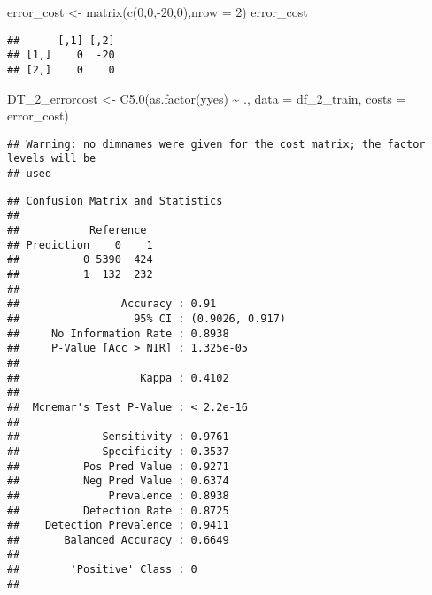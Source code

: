 \documentclass[
]{article}
\newenvironment{Shaded}{\begin{snugshade}}{\end{snugshade}}
\newcommand{\AttributeTok}[1]{\textcolor[rgb]{0.77,0.63,0.00}{#1}}
\newcommand{\DecValTok}[1]{\textcolor[rgb]{0.00,0.00,0.81}{#1}}
\newcommand{\FunctionTok}[1]{\textcolor[rgb]{0.00,0.00,0.00}{#1}}
\newcommand{\NormalTok}[1]{#1}
\newcommand{\OtherTok}[1]{\textcolor[rgb]{0.56,0.35,0.01}{#1}}
\newcommand{\SpecialCharTok}[1]{\textcolor[rgb]{0.00,0.00,0.00}{#1}}
\begin{document}
\begin{Shaded}
\begin{Highlighting}[]
\NormalTok{error\_cost }\OtherTok{\textless{}{-}} \FunctionTok{matrix}\NormalTok{(}\FunctionTok{c}\NormalTok{(}\DecValTok{0}\NormalTok{,}\DecValTok{0}\NormalTok{,}\SpecialCharTok{{-}}\DecValTok{20}\NormalTok{,}\DecValTok{0}\NormalTok{),}\AttributeTok{nrow =} \DecValTok{2}\NormalTok{)}
\NormalTok{error\_cost}
\end{Highlighting}
\end{Shaded}

\begin{verbatim}
##      [,1] [,2]
## [1,]    0  -20
## [2,]    0    0
\end{verbatim}

\begin{Shaded}
\begin{Highlighting}[]
\NormalTok{DT\_2\_errorcost }\OtherTok{\textless{}{-}} \FunctionTok{C5.0}\NormalTok{(}\FunctionTok{as.factor}\NormalTok{(yyes) }\SpecialCharTok{\textasciitilde{}}\NormalTok{ ., }\AttributeTok{data =}\NormalTok{ df\_2\_train, }\AttributeTok{costs =}\NormalTok{ error\_cost)}
\end{Highlighting}
\end{Shaded}

\begin{verbatim}
## Warning: no dimnames were given for the cost matrix; the factor levels will be
## used
\end{verbatim}

\begin{Shaded}
\end{Shaded}

\begin{verbatim}
## Confusion Matrix and Statistics
## 
##           Reference
## Prediction    0    1
##          0 5390  424
##          1  132  232
##                                          
##                Accuracy : 0.91           
##                  95% CI : (0.9026, 0.917)
##     No Information Rate : 0.8938         
##     P-Value [Acc > NIR] : 1.325e-05      
##                                          
##                   Kappa : 0.4102         
##                                          
##  Mcnemar's Test P-Value : < 2.2e-16      
##                                          
##             Sensitivity : 0.9761         
##             Specificity : 0.3537         
##          Pos Pred Value : 0.9271         
##          Neg Pred Value : 0.6374         
##              Prevalence : 0.8938         
##          Detection Rate : 0.8725         
##    Detection Prevalence : 0.9411         
##       Balanced Accuracy : 0.6649         
##                                          
##        'Positive' Class : 0              
## 
\end{verbatim}
\end{document}
